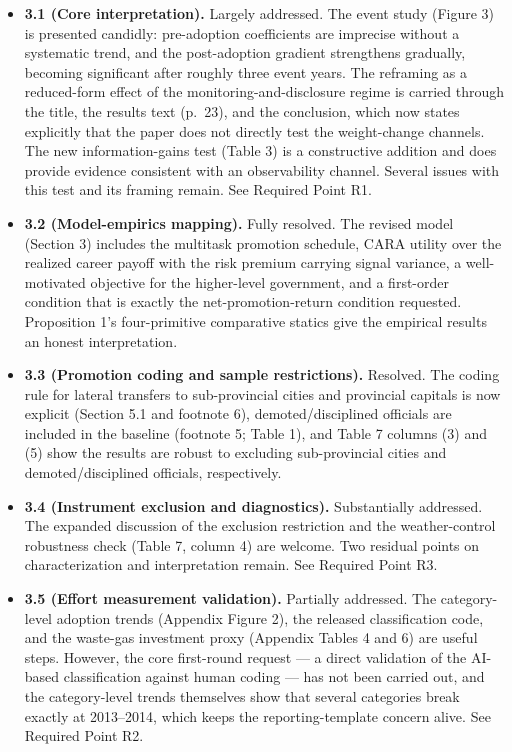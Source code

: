 \documentclass[12pt]{article}
\begin{document}
\begin{itemize}
    \item \textbf{3.1 (Core interpretation).} Largely addressed. The event study (Figure 3) is presented candidly: pre-adoption coefficients are imprecise without a systematic trend, and the post-adoption gradient strengthens gradually, becoming significant after roughly three event years. The reframing as a reduced-form effect of the monitoring-and-disclosure regime is carried through the title, the results text (p.~23), and the conclusion, which now states explicitly that the paper does not directly test the weight-change channels. The new information-gains test (Table 3) is a constructive addition and does provide evidence consistent with an observability channel. Several issues with this test and its framing remain. See Required Point R1.

    \item \textbf{3.2 (Model-empirics mapping).} Fully resolved. The revised model (Section 3) includes the multitask promotion schedule, CARA utility over the realized career payoff with the risk premium carrying signal variance, a well-motivated objective for the higher-level government, and a first-order condition that is exactly the net-promotion-return condition requested. Proposition 1's four-primitive comparative statics give the empirical results an honest interpretation.

    \item \textbf{3.3 (Promotion coding and sample restrictions).} Resolved. The coding rule for lateral transfers to sub-provincial cities and provincial capitals is now explicit (Section 5.1 and footnote 6), demoted/disciplined officials are included in the baseline (footnote 5; Table 1), and Table 7 columns (3) and (5) show the results are robust to excluding sub-provincial cities and demoted/disciplined officials, respectively.

    \item \textbf{3.4 (Instrument exclusion and diagnostics).} Substantially addressed. The expanded discussion of the exclusion restriction and the weather-control robustness check (Table 7, column 4) are welcome. Two residual points on characterization and interpretation remain. See Required Point R3.

    \item \textbf{3.5 (Effort measurement validation).} Partially addressed. The category-level adoption trends (Appendix Figure 2), the released classification code, and the waste-gas investment proxy (Appendix Tables 4 and 6) are useful steps. However, the core first-round request --- a direct validation of the AI-based classification against human coding --- has not been carried out, and the category-level trends themselves show that several categories break exactly at 2013--2014, which keeps the reporting-template concern alive. See Required Point R2.


\end{itemize}
\end{document}
